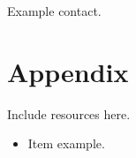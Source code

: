 \documentclass[12pt,a4paper]{article}
\begin{document}
Example contact.


\section{Appendix}
Include resources here.

\begin{itemize}
	\item Item example.
\end{itemize}





\end{document}
